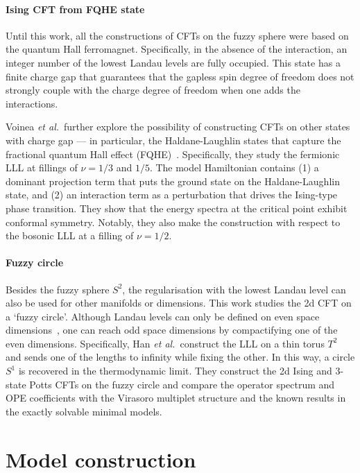 \documentclass{timesjhep}
\begin{document}
\paragraph{Ising CFT from FQHE state~\cite{Voinea2024}}

Until this work, all the constructions of CFTs on the fuzzy sphere were based on the quantum Hall ferromagnet. Specifically, in the absence of the interaction, an integer number of the lowest Landau levels are fully occupied. This state has a finite charge gap that guarantees that the gapless spin degree of freedom does not strongly couple with the charge degree of freedom when one adds the interactions.

Voinea \textit{et al.}~further explore the possibility of constructing CFTs on other states with charge gap --- in particular, the Haldane-Laughlin states that capture the fractional quantum Hall effect (FQHE)~\cite{Haldane1983LLL,Laughlin1983FQHE}. Specifically, they study the fermionic LLL at fillings of $\nu=1/3$ and $1/5$. The model Hamiltonian contains (1) a dominant projection term that puts the ground state on the Haldane-Laughlin state, and (2) an interaction term as a perturbation that drives the Ising-type phase transition. They show that the energy spectra at the critical point exhibit conformal symmetry. Notably, they also make the construction with respect to the bosonic LLL at a filling of $\nu=1/2$.

\paragraph{Fuzzy circle~\cite{Han2025}}

Besides the fuzzy sphere $S^2$, the regularisation with the lowest Landau level can also be used for other manifolds or dimensions. This work studies the 2d CFT on a `fuzzy circle'. Although Landau levels can only be defined on even space dimensions~\cite{Hasebe2020Landau}, one can reach odd space dimensions by compactifying one of the even dimensions. Specifically, Han \textit{et al.}~construct the LLL on a thin torus $T^2$ and sends one of the lengths to infinity while fixing the other. In this way, a circle $S^1$ is recovered in the thermodynamic limit. They construct the 2d Ising and 3-state Potts CFTs on the fuzzy circle and compare the operator spectrum and OPE coefficients with the Virasoro multiplet structure and the known results in the exactly solvable minimal models.

\section{Model construction}
\label{sec:construct}
\end{document}
